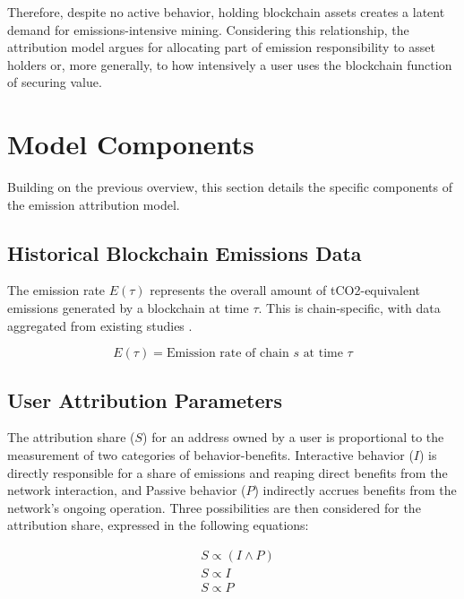 \documentclass[11pt]{report}
\begin{document}
Therefore, despite no active behavior, holding blockchain assets creates a latent demand for emissions-intensive mining. Considering this relationship, the attribution model argues for allocating part of emission responsibility to asset holders or, more generally, to how intensively a user uses the blockchain function of securing value.

\section{Model Components}

Building on the previous overview, this section details the specific components of the emission attribution model.

\subsection{Historical Blockchain Emissions Data}
The emission rate \(E(\tau)\) represents the overall amount of tCO2-equivalent emissions generated by a blockchain at time $\tau$. This is chain-specific, with data aggregated from existing studies \cite{neumuellerCambridgeBitcoinElectricity2021,stollCarbonFootprintBitcoin2019}.

\begin{equation}
    E(\tau) = \text{Emission rate of chain $s$ at time $\tau$}
    \label{eq:emission_rate}
\end{equation}


\subsection{User Attribution Parameters}

The attribution share ($S$) for an address owned by a user is proportional to the measurement of two categories of behavior-benefits. Interactive behavior ($I$) is directly responsible for a share of emissions and reaping direct benefits from the network interaction, and Passive behavior ($P$) indirectly accrues benefits from the network's ongoing operation. Three possibilities are then considered for the attribution share, expressed in the following equations:

\begin{align}
     & S \propto (I \wedge P) \\
     & S \propto I            \\
     & S \propto P
    \label{eq:attribution_share}
\end{align}
\end{document}
